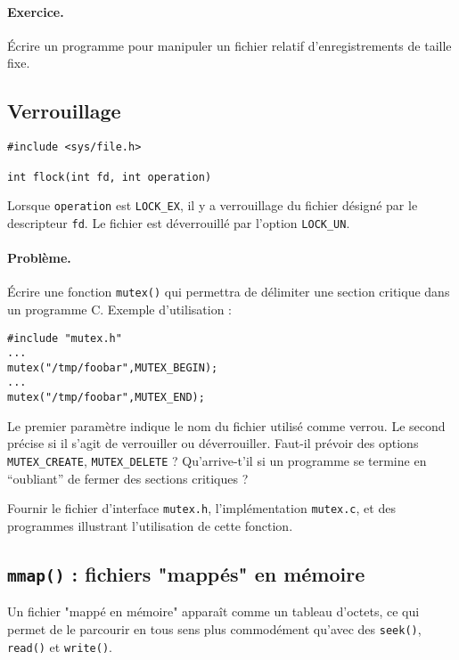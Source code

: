 \paragraph*{Exercice. } Écrire un programme pour manipuler un fichier relatif 
d'enregistrements de taille fixe.

\subsection{Verrouillage}

\extrait
\begin{lstlisting}
#include <sys/file.h>

int flock(int fd, int operation)
\end{lstlisting}


Lorsque \texttt{operation} est \texttt{LOCK\_EX}, il y a verrouillage
du fichier désigné par le descripteur \texttt{fd}. Le fichier est
déverrouillé par l'option \texttt{LOCK\_UN}.

\paragraph*{Problème. } Écrire une fonction \texttt{mutex()}
qui permettra de 
délimiter une section critique dans un programme C. Exemple
d'utilisation :

\extrait
\begin{lstlisting}
#include "mutex.h"
...
mutex("/tmp/foobar",MUTEX_BEGIN);
...
mutex("/tmp/foobar",MUTEX_END);

\end{lstlisting}

Le premier paramètre indique le nom du fichier utilisé comme
verrou. Le second précise si il s'agit de verrouiller ou
déverrouiller. Faut-il prévoir des options \texttt{MUTEX\_CREATE},
\texttt{MUTEX\_DELETE} ? Qu'arrive-t'il si un programme se termine en
``oubliant'' de fermer des sections critiques ? 

Fournir le fichier
d'interface \texttt{mutex.h}, l'implémentation \texttt{mutex.c}, et
des programmes illustrant l'utilisation de cette fonction.

 
\subsection{\texttt{mmap()} : fichiers "mappés" en mémoire}

Un fichier "mappé en mémoire" apparaît comme un tableau d'octets, ce
qui permet de le parcourir en tous sens plus commodément qu'avec des
\texttt{seek()}, \texttt{read()} et \texttt{write()}. 

